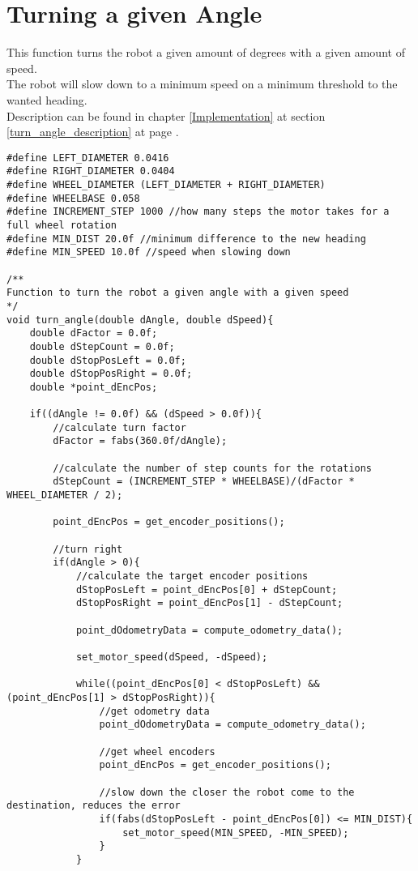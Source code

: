 \section{Turning a given Angle}
\label{turning_amgle_code}
This function turns the robot a given amount of degrees with a given amount of speed.\\
The robot will slow down to a minimum speed on a minimum threshold to the wanted heading.\\
Description can be found in chapter \ref{Implementation} at section \ref{turn_angle_description} at page \pageref{turn_angle_description}. 

\begin{lstlisting}[caption = {Turning an angle}]
#define LEFT_DIAMETER 0.0416
#define RIGHT_DIAMETER 0.0404
#define WHEEL_DIAMETER (LEFT_DIAMETER + RIGHT_DIAMETER)
#define WHEELBASE 0.058 
#define INCREMENT_STEP 1000 //how many steps the motor takes for a full wheel rotation
#define MIN_DIST 20.0f //minimum difference to the new heading
#define MIN_SPEED 10.0f //speed when slowing down

/**
Function to turn the robot a given angle with a given speed
*/
void turn_angle(double dAngle, double dSpeed){
	double dFactor = 0.0f;
	double dStepCount = 0.0f;
	double dStopPosLeft = 0.0f;
	double dStopPosRight = 0.0f;
	double *point_dEncPos;
	
	if((dAngle != 0.0f) && (dSpeed > 0.0f)){
		//calculate turn factor
		dFactor = fabs(360.0f/dAngle);
		
		//calculate the number of step counts for the rotations
		dStepCount = (INCREMENT_STEP * WHEELBASE)/(dFactor * WHEEL_DIAMETER / 2);
		
		point_dEncPos = get_encoder_positions();
		
		//turn right
		if(dAngle > 0){
			//calculate the target encoder positions
			dStopPosLeft = point_dEncPos[0] + dStepCount;
			dStopPosRight = point_dEncPos[1] - dStepCount;
			
			point_dOdometryData = compute_odometry_data();
			
			set_motor_speed(dSpeed, -dSpeed);
			
			while((point_dEncPos[0] < dStopPosLeft) && (point_dEncPos[1] > dStopPosRight)){
				//get odometry data
				point_dOdometryData = compute_odometry_data();
				
				//get wheel encoders
				point_dEncPos = get_encoder_positions();
				
				//slow down the closer the robot come to the destination, reduces the error
				if(fabs(dStopPosLeft - point_dEncPos[0]) <= MIN_DIST){
					set_motor_speed(MIN_SPEED, -MIN_SPEED);
				}
			}	
		

\end{lstlisting}
